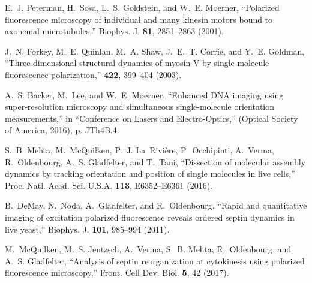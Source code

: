 \documentclass[10pt]{article}
\begin{document}

% 
% 




\begin{thebibliography}{10}
\newcommand{\enquote}[1]{``#1''}

E.~J. Peterman, H.~Sosa, L.~S. Goldstein, and W.~E. Moerner, \enquote{Polarized
  fluorescence microscopy of individual and many kinesin motors bound to
  axonemal microtubules,} Biophys. J. \textbf{81}, 2851--2863 (2001).

J.~N. Forkey, M.~E. Quinlan, M.~A. Shaw, J.~E.~T. Corrie, and Y.~E. Goldman,
  \enquote{Three-dimensional structural dynamics of myosin {V} by
  single-molecule fluorescence polarization,} \nat \textbf{422}, 399--404
  (2003).

A.~S. Backer, M.~Lee, and W.~E. Moerner, \enquote{Enhanced {DNA} imaging using
  super-resolution microscopy and simultaneous single-molecule orientation
  measurements,} in \enquote{Conference on Lasers and Electro-Optics,}
  (Optical Society of America, 2016), p. JTh4B.4.

S.~B. Mehta, M.~McQuilken, P.~J. La~Rivi\`ere, P.~Occhipinti, A.~Verma,
  R.~Oldenbourg, A.~S. Gladfelter, and T.~Tani, \enquote{Dissection of
  molecular assembly dynamics by tracking orientation and position of single
  molecules in live cells,} Proc. Natl. Acad. Sci. U.S.A. \textbf{113},
  E6352--E6361 (2016).

B.~DeMay, N.~Noda, A.~Gladfelter, and R.~Oldenbourg, \enquote{Rapid and
  quantitative imaging of excitation polarized fluorescence reveals ordered
  septin dynamics in live yeast,} Biophys. J. \textbf{101}, 985--994 (2011).

M.~McQuilken, M.~S. Jentzsch, A.~Verma, S.~B. Mehta, R.~Oldenbourg, and A.~S.
  Gladfelter, \enquote{Analysis of septin reorganization at cytokinesis using
  polarized fluorescence microscopy,} Front. Cell Dev. Biol. \textbf{5}, 42
  (2017).


\end{thebibliography}
\end{document}
